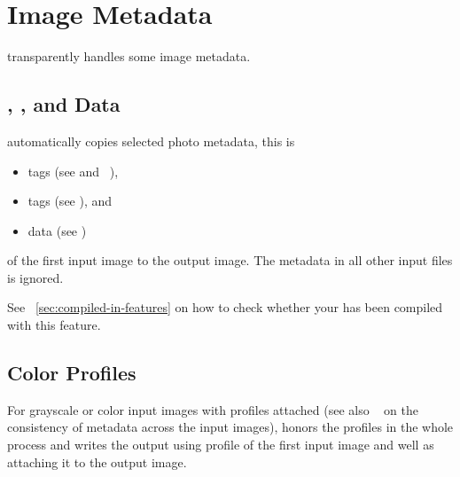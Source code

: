 

\section{\label{sec:metadata}%
  Image Metadata}

\App{} transparently handles some image metadata.


\subsection{\label{sec:metadata-exif-iptc-xmp}%
  , , and  Data}

\App{} automatically copies selected photo metadata, this is

\begin{itemize}
\item
   tags (see  and
  \appendixName~),

\item
   tags (see ), and

\item
   data (see )
\end{itemize}

\noindent of the first input image to the output image.  The metadata in all other input files
is ignored.

See \sectionName~\ref{sec:compiled-in-features} on how to check whether your \App{} has been
compiled with this feature.


\subsection{\label{sec:metadata-icc}%
   Color Profiles}

For grayscale or color input images with  profiles attached (see also
\sectionName~ on the consistency of  metadata
across the input images), \App{} honors the profiles in the whole \appisdoing{} process and
writes the output using  profile of the first input image and well as attaching it
to the output image.

